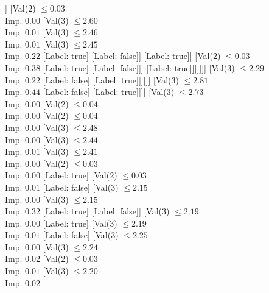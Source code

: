 \documentclass[margin=10pt]{standalone}
\begin{document}
\begin{forest}
																	]
																[Val($2$) $ \leq 0.03$ \\ Imp. $0.00$
																	[Val($3$) $ \leq 2.60$ \\ Imp. $0.01$
																		[Val($3$) $ \leq 2.46$ \\ Imp. $0.01$
																			[Val($3$) $ \leq 2.45$ \\ Imp. $0.22$
																				[Label: true]
																				[Label: false]]
																			[Label: true]]
																		[Val($2$) $ \leq 0.03$ \\ Imp. $0.38$
																			[Label: true]
																			[Label: false]]]
																	[Label: true]]]]]]]
											[Val($3$) $ \leq 2.29$ \\ Imp. $0.22$
												[Label: false]
												[Label: true]]]]]]
							[Val($3$) $ \leq 2.81$ \\ Imp. $0.44$
								[Label: false]
								[Label: true]]]]
					[Val($3$) $ \leq 2.73$ \\ Imp. $0.00$
						[Val($2$) $ \leq 0.04$ \\ Imp. $0.00$
							[Val($2$) $ \leq 0.04$ \\ Imp. $0.00$
								[Val($3$) $ \leq 2.48$ \\ Imp. $0.00$
									[Val($3$) $ \leq 2.44$ \\ Imp. $0.01$
										[Val($3$) $ \leq 2.41$ \\ Imp. $0.00$
											[Val($2$) $ \leq 0.03$ \\ Imp. $0.00$
												[Label: true]
												[Val($2$) $ \leq 0.03$ \\ Imp. $0.01$
													[Label: false]
													[Val($3$) $ \leq 2.15$ \\ Imp. $0.00$
														[Val($3$) $ \leq 2.15$ \\ Imp. $0.32$
															[Label: true]
															[Label: false]]
														[Val($3$) $ \leq 2.19$ \\ Imp. $0.00$
															[Label: true]
															[Val($3$) $ \leq 2.19$ \\ Imp. $0.01$
																[Label: false]
																[Val($3$) $ \leq 2.25$ \\ Imp. $0.00$
																	[Val($3$) $ \leq 2.24$ \\ Imp. $0.02$
																		[Val($2$) $ \leq 0.03$ \\ Imp. $0.01$
																			[Val($3$) $ \leq 2.20$ \\ Imp. $0.02$

\end{forest}
\end{document}
